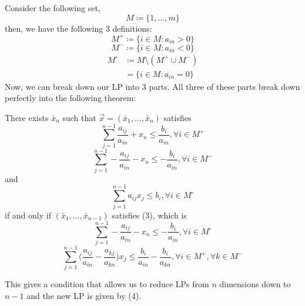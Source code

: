 \documentclass[11pt]{article}
\begin{document}
Consider the following set,
\begin{equation*}
M \coloneqq \{1 ,\dots, m\} 
\end{equation*}
then, we have the following 3 definitions:
\begin{equation*}
M^+ \coloneqq \{i \in M : a_{in} > 0\}
\end{equation*}
\begin{equation*}
M^- \coloneqq \{i \in M : a_{in} < 0\}
\end{equation*}
\begin{align*}
M^\circ &\coloneqq M \setminus (M^+ \cup M^-)\\
&= \{i \in M: a_{in} = 0\}
\end{align*}
Now, we can break down our LP into 3 parts. All three of these parts break down
perfectly into the following theorem:
\begin{theorem}
There exists $\bar{x}_n$ such that $\vec x = (\bar{x}_1, \dots, \bar{x}_n)$
satisfies
\begin{equation}
\sum^{n-1}_{j=1} \frac{a_{ij}}{a_{in}} + x_n \leq \frac{b_i}{a_{in}}, \forall i
\in M^+
\end{equation}
\begin{equation}
\sum^{n-1}_{j=1} -\frac{a_{ij}}{a_{in}} - x_n \leq -\frac{b_i}{a_{in}}, \forall i
\in M^-
\end{equation}
and
\begin{equation}
\sum^{n-1}_{j=1}a_{ij}x_j \leq  b_i, \forall i \in M^\circ
\end{equation}
if and only if $(\bar{x}_1, \dots, \bar{x}_{n-1})$ satisfies (3), which is
\begin{equation*}
\sum^{n-1}_{j=1} -\frac{a_{ij}}{a_{in}} - x_n \leq -\frac{b_i}{a_{in}}, \forall i
\in M^\circ
\end{equation*}
\begin{equation}
\sum^{n-1}_{j=1}\Big(\frac{a_{ij}}{a_{in}} - \frac{a_{kj}}{a_{kn}} \Big)x_j
\leq \frac{b_i}{a_{in}} - \frac{b_i}{a_{kn}} , \forall i \in M^+, \forall k \in
M^-
\end{equation}
\begin{remark}
This gives a condition that allows us to reduce LPs from $n$ dimensions down to
$n-1$ and the new LP is given by (4).
\end{remark}
\end{theorem}
\end{document}
